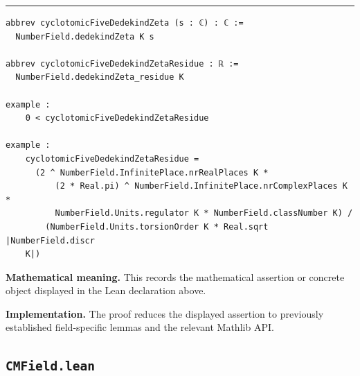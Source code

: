 \documentclass[UTF8,a4paper,11pt,fontset=fandol]{ctexart}
\theoremstyle{definition}
\newcommand{\statementsep}{\par\medskip\hrule\medskip}
\begin{document}
\statementsep
\begin{verbatim}
abbrev cyclotomicFiveDedekindZeta (s : ℂ) : ℂ :=
  NumberField.dedekindZeta K s

abbrev cyclotomicFiveDedekindZetaResidue : ℝ :=
  NumberField.dedekindZeta_residue K

example :
    0 < cyclotomicFiveDedekindZetaResidue

example :
    cyclotomicFiveDedekindZetaResidue =
      (2 ^ NumberField.InfinitePlace.nrRealPlaces K *
          (2 * Real.pi) ^ NumberField.InfinitePlace.nrComplexPlaces K *
          NumberField.Units.regulator K * NumberField.classNumber K) /
        (NumberField.Units.torsionOrder K * Real.sqrt |NumberField.discr
    K|)
\end{verbatim}
\noindent\textbf{Mathematical meaning.} This records the mathematical assertion or concrete object displayed in the Lean declaration above.\par
\noindent\textbf{Implementation.} The proof reduces the displayed assertion to previously established field-specific lemmas and the relevant Mathlib API.\par

\subsection{\texttt{CMField.lean}}
\end{document}

